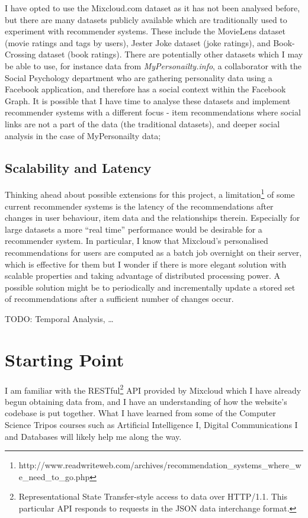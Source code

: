 I have opted to use the Mixcloud.com dataset as it has not been analysed before, but there are many datasets publicly available which are traditionally used to experiment with recommender systems. These include the MovieLens dataset (movie ratings and tags by users), Jester Joke dataset (joke ratings), and Book-Crossing dataset (book ratings). There are potentially other datasets which I may be able to use, for instance data from \emph{MyPersonailty.info}, a collaborator with the Social Psychology department who are gathering personality data using a Facebook application, and therefore has a social context within the Facebook Graph. It is possible that I have time to analyse these datasets and implement recommender systems with a different focus - item recommendations where social links are not a part of the data (the traditional datasets), and deeper social analysis in the case of MyPersonailty data;

\subsection*{Scalability and Latency}
Thinking ahead about possible extensions for this project, a limitation\footnote{http://www.readwriteweb.com/archives/recommendation\_systems\_where\_we\_need\_to\_go.php} of some current recommender systems is the latency of the recommendations after changes in user behaviour, item data and the relationships therein. Especially for large datasets a more ``real time'' performance would be desirable for a recommender system. In particular, I know that Mixcloud's personalised recommendations for users are computed as a batch job overnight on their server, which is effective for them but I wonder if there is more elegant solution with scalable properties and taking advantage of distributed processing power. A possible solution might be to periodically and incrementally update a stored set of recommendations after a sufficient number of changes occur.

TODO: Temporal Analysis, \ldots

\section{Starting Point}

I am familiar with the RESTful\footnote{Representational State Transfer-style access to data over HTTP/1.1. This particular API responds to requests in the JSON data interchange format.} API provided by Mixcloud which I have already begun obtaining data from, and I have an understanding of how the website's codebase is put together. What I have learned from some of the Computer Science Tripos courses such as Artificial Intelligence I, Digital Communications I and Databases will likely help me along the way.

